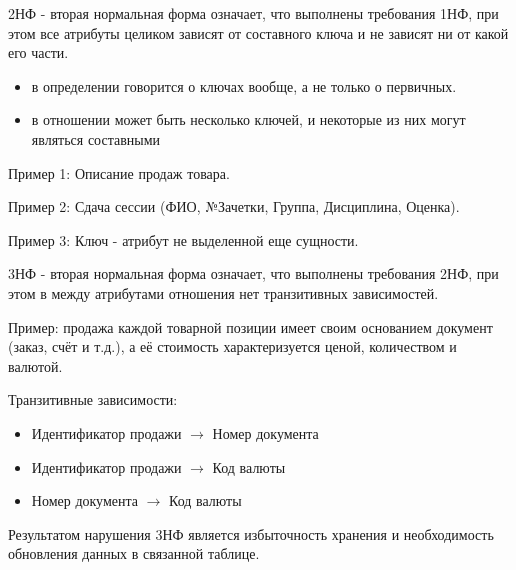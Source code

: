 \documentclass{beamer}
\begin{document}
\begin{frame}
\begin{block}{2НФ - вторая нормальная форма}
означает, что выполнены требования 1НФ, при этом все атрибуты целиком зависят от составного ключа и не
зависят ни от какой его части.
\end{block}
\begin{itemize}
\item в определении говорится о ключах вообще, а не только о первичных. 
\item в отношении может быть несколько ключей, и некоторые из них могут являться составными
\end{itemize}
Пример 1: Описание продаж товара.

Пример 2: Сдача сессии (ФИО, №Зачетки, Группа, Дисциплина, Оценка).

Пример 3: Ключ - атрибут не выделенной еще сущности.
\end{frame}

\begin{frame}
\begin{block}{3НФ - вторая нормальная форма}
означает, что выполнены требования 2НФ, при этом в между атрибутами отношения нет транзитивных
зависимостей.
\end{block}
Пример: продажа каждой товарной позиции имеет своим основанием документ (заказ, счёт и т.д.), а её стоимость характеризуется ценой, количеством и валютой.

Транзитивные зависимости:
\begin{itemize}
\item Идентификатор продажи $\rightarrow$ Номер документа
\item Идентификатор продажи $\rightarrow$ Код валюты
\item Номер документа $\rightarrow$ Код валюты
\end{itemize}
Результатом нарушения 3НФ является избыточность хранения и необходимость обновления данных в связанной таблице.
\end{frame}
\end{document}
